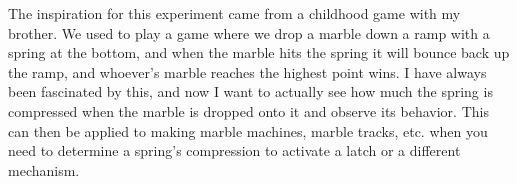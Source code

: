 The inspiration for this experiment came from a childhood game with my brother. We used to play a game where we drop a marble down a ramp with a spring at the bottom, and when the marble hits the spring it will bounce back up the ramp, and whoever’s marble reaches the highest point wins. I have always been fascinated by this, and now I want to actually see how much the spring is compressed when the marble is dropped onto it and observe its behavior. This can then be applied to making marble machines, marble tracks, etc. when you need to determine a spring's compression to activate a latch or a different mechanism.
